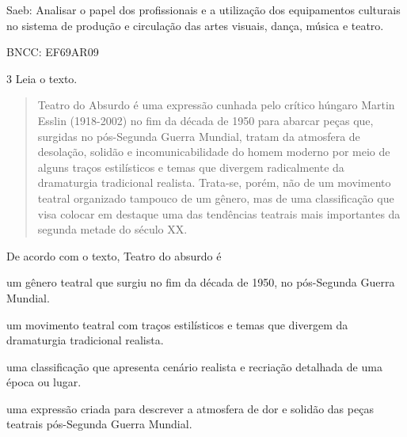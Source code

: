 \begin{escolha}
{Saeb: Analisar o papel dos profissionais e a utilização dos
equipamentos culturais no sistema de produção e circulação das artes
visuais, dança, música e teatro.

BNCC: EF69AR09}

\num{3} Leia o texto.

\begin{quote}
Teatro do Absurdo é uma expressão cunhada pelo crítico húngaro Martin
Esslin (1918-2002) no fim da década de 1950 para abarcar peças que,
surgidas no pós-Segunda Guerra Mundial, tratam da atmosfera de
desolação, solidão e incomunicabilidade do homem moderno por meio de
alguns traços estilísticos e temas que divergem radicalmente da
dramaturgia tradicional realista. Trata-se, porém, não de um movimento
teatral organizado tampouco de um gênero, mas de uma classificação que
visa colocar em destaque uma das tendências teatrais mais importantes da
segunda metade do século XX.

\end{quote}

De acordo com o texto, Teatro do absurdo é

\begin{escolha}
\item
  um gênero teatral que surgiu no fim da década de 1950, no pós-Segunda
  Guerra Mundial.
\item
  um movimento teatral com traços estilísticos e temas que divergem da
  dramaturgia tradicional realista.
\item
  uma classificação que apresenta cenário realista e recriação detalhada
  de uma época ou lugar.
\item
  uma expressão criada para descrever a atmosfera de dor e solidão das
  peças teatrais pós-Segunda Guerra Mundial.
\end{escolha}

\end{escolha}
